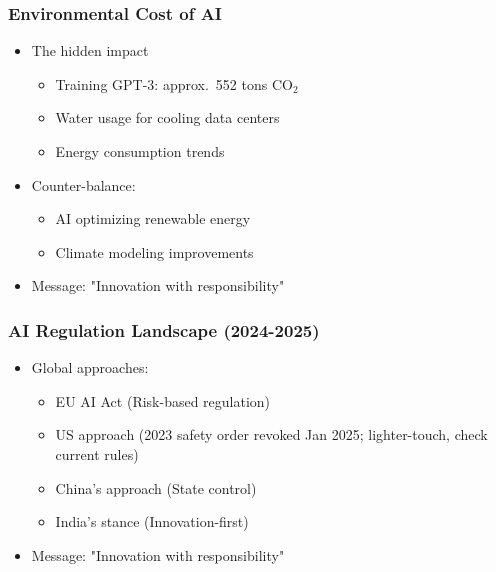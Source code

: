 \begin{frame}[fragile]\frametitle{Environmental Cost of AI}
\begin{itemize}
\item The hidden impact
	\begin{itemize}
	\item Training GPT-3: approx.\ 552 tons CO$_2$
	\item Water usage for cooling data centers
	\item Energy consumption trends
	\end{itemize}

\item  Counter-balance:
	\begin{itemize}
	\item AI optimizing renewable energy
	\item Climate modeling improvements
	\end{itemize}
\item Message: "Innovation with responsibility"	
\end{itemize}
\end{frame}

\begin{frame}[fragile]\frametitle{AI Regulation Landscape (2024-2025)}
\begin{itemize}
\item Global approaches:
	\begin{itemize}
	\item EU AI Act (Risk-based regulation)
	\item US approach (2023 safety order revoked Jan 2025; lighter-touch, check current rules)
	\item China's approach (State control)
	\item India's stance (Innovation-first)
	\end{itemize}
\item Message: "Innovation with responsibility"	
\end{itemize}
\end{frame}

